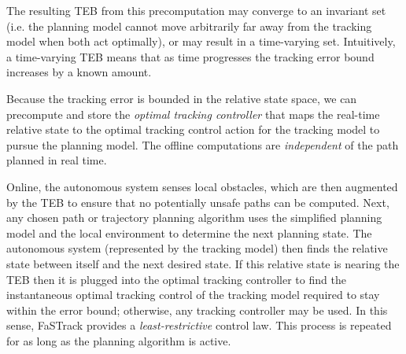 The resulting TEB from this precomputation may converge to an invariant set (i.e. the planning model cannot move arbitrarily far away from the tracking model when both act optimally), or may result in a time-varying set.
Intuitively, a time-varying TEB means that as time progresses the tracking error bound increases by a known amount.

Because the tracking error is bounded in the relative state space, we can precompute and store the \textit{optimal tracking controller} that maps the real-time relative state to the optimal tracking control action for the tracking model to pursue the planning model. 
The offline computations are \textit{independent} of the path planned in real time.

Online, the autonomous system senses local obstacles, which are then augmented by the TEB to ensure that no potentially unsafe paths can be computed. 
Next, any chosen path or trajectory planning algorithm uses the simplified planning model and the local environment to determine the next planning state. 
The autonomous system (represented by the tracking model) then finds the relative state between itself and the next desired state. 
If this relative state is nearing the TEB then it is plugged into the optimal tracking controller to find the instantaneous optimal tracking control of the tracking model required to stay within the error bound; otherwise, any tracking controller may be used. In this sense, FaSTrack provides a \emph{least-restrictive} control law.
This process is repeated for as long as the planning algorithm is active. 

